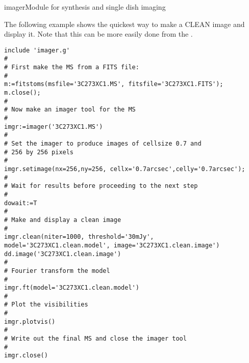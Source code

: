 \begin{ahmodule}{imager}{Module for synthesis and single dish imaging}
\begin{ahexample}
The following example shows the quickest way to make a CLEAN image and
display it. Note that this can be more easily done from the
.
\begin{verbatim}
include 'imager.g'
#
# First make the MS from a FITS file:
#
m:=fitstoms(msfile='3C273XC1.MS', fitsfile='3C273XC1.FITS'); m.close();
#
# Now make an imager tool for the MS
#
imgr:=imager('3C273XC1.MS')      
#
# Set the imager to produce images of cellsize 0.7 and
# 256 by 256 pixels
#
imgr.setimage(nx=256,ny=256, cellx='0.7arcsec',celly='0.7arcsec');
#
# Wait for results before proceeding to the next step
#
dowait:=T
#
# Make and display a clean image
#
imgr.clean(niter=1000, threshold='30mJy',
model='3C273XC1.clean.model', image='3C273XC1.clean.image')
dd.image('3C273XC1.clean.image')
#
# Fourier transform the model 
#
imgr.ft(model='3C273XC1.clean.model')
#
# Plot the visibilities
#
imgr.plotvis()
#
# Write out the final MS and close the imager tool
#
imgr.close()
\end{verbatim}
\end{ahexample}


\end{ahmodule}
